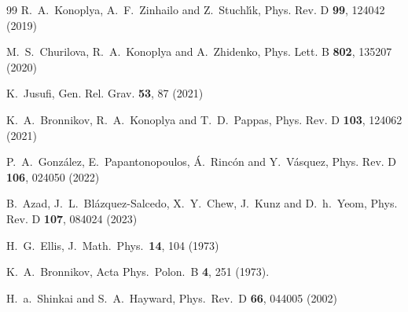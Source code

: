 \documentclass[11pt,a4paper]{article}
\begin{document}
\begin{thebibliography}{99}
R.~A.~Konoplya, A.~F.~Zinhailo and Z.~Stuchl\'\i{}k,
Phys. Rev. D \textbf{99}, 124042 (2019)

M.~S.~Churilova, R.~A.~Konoplya and A.~Zhidenko,
Phys. Lett. B \textbf{802}, 135207 (2020)

K.~Jusufi,
Gen. Rel. Grav. \textbf{53}, 87 (2021)

K.~A.~Bronnikov, R.~A.~Konoplya and T.~D.~Pappas,
Phys. Rev. D \textbf{103}, 124062 (2021)

P.~A.~Gonz\'alez, E.~Papantonopoulos, \'A.~Rinc\'on and Y.~V\'asquez,
Phys. Rev. D \textbf{106}, 024050 (2022)

B.~Azad, J.~L.~Bl\'azquez-Salcedo, X.~Y.~Chew, J.~Kunz and D.~h.~Yeom,
Phys. Rev. D \textbf{107}, 084024 (2023)


  H.~G.~Ellis,
  J.\ Math.\ Phys.\  {\bf 14}, 104 (1973)

  K.~A.~Bronnikov,
  Acta Phys.\ Polon.\ B {\bf 4}, 251 (1973).


  H.~a.~Shinkai and S.~A.~Hayward,
  Phys.\ Rev.\ D {\bf 66}, 044005 (2002)


\end{thebibliography}
\end{document}
